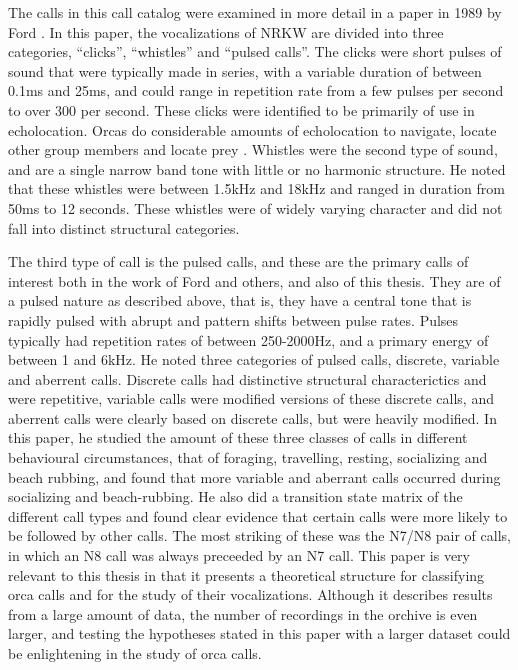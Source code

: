 The calls in this call catalog were examined in more detail in a paper
in 1989 by Ford \cite{ford89}.  In this paper, the vocalizations of
NRKW are divided into three categories, ``clicks'', ``whistles'' and
``pulsed calls''.  The clicks were short pulses of sound that were
typically made in series, with a variable duration of between 0.1ms
and 25ms, and could range in repetition rate from a few pulses per
second to over 300 per second.  These clicks were identified to be
primarily of use in echolocation.  Orcas do considerable amounts of
echolocation to navigate, locate other group members and locate prey
\cite{barretlennard96}.  Whistles were the second type of sound, and
are a single narrow band tone with little or no harmonic structure.
He noted that these whistles were between 1.5kHz and 18kHz and ranged
in duration from 50ms to 12 seconds.  These whistles were of widely
varying character and did not fall into distinct structural
categories.

The third type of call is the pulsed calls, and these are the primary
calls of interest both in the work of Ford and others, and also of
this thesis.  They are of a pulsed nature as described above, that is,
they have a central tone that is rapidly pulsed with abrupt and
pattern shifts between pulse rates.  Pulses typically had repetition
rates of between 250-2000Hz, and a primary energy of between 1 and
6kHz.  He noted three categories of pulsed calls, discrete, variable
and aberrent calls.  Discrete calls had distinctive structural
characterictics and were repetitive, variable calls were modified
versions of these discrete calls, and aberrent calls were clearly
based on discrete calls, but were heavily modified.  In this paper, he
studied the amount of these three classes of calls in different
behavioural circumstances, that of foraging, travelling, resting,
socializing and beach rubbing, and found that more variable and
aberrant calls occurred during socializing and beach-rubbing.  He also
did a transition state matrix of the different call types and found
clear evidence that certain calls were more likely to be followed by
other calls.  The most striking of these was the N7/N8 pair of calls,
in which an N8 call was always preceeded by an N7 call.  This paper is
very relevant to this thesis in that it presents a theoretical
structure for classifying orca calls and for the study of their
vocalizations.  Although it describes results from a large amount of
data, the number of recordings in the orchive is even larger, and
testing the hypotheses stated in this paper with a larger dataset
could be enlightening in the study of orca calls.

